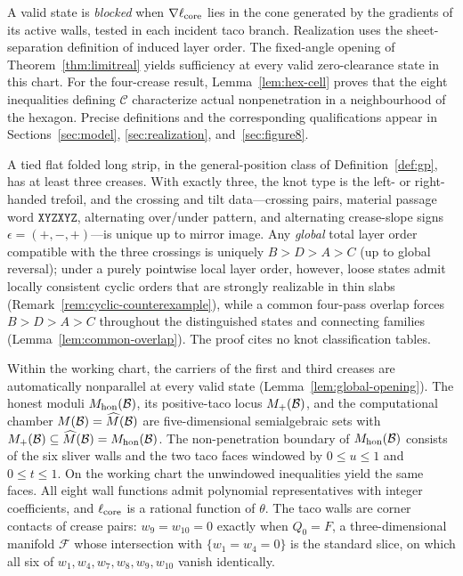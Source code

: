 A valid state is \emph{blocked} when $\nabla\ell_{\mathrm{core}}$ lies in the cone generated by the gradients of its active walls, tested in each incident taco branch. Realization uses the sheet-separation definition of induced layer order. The fixed-angle opening of Theorem~\ref{thm:limitreal} yields sufficiency at every valid zero-clearance state in this chart. For the four-crease result, Lemma~\ref{lem:hex-cell} proves that the eight inequalities defining $\mathcal C$ characterize actual nonpenetration in a neighbourhood of the hexagon. Precise definitions and the corresponding qualifications appear in Sections~\ref{sec:model}, \ref{sec:realization}, and~\ref{sec:figure8}.

\begin{mainthm}\label{mainthm:fold}
A tied flat folded long strip, in the general-position class of Definition~\textup{\ref{def:gp}}, has at least three creases. With exactly three, the knot type is the left- or right-handed trefoil, and the crossing and tilt data---crossing pairs, material passage word $\mathtt{XYZXYZ}$, alternating over/under pattern, and alternating crease-slope signs $\epsilon=(+,-,+)$---is unique up to mirror image. Any \emph{global} total layer order compatible with the three crossings is uniquely $B>D>A>C$ (up to global reversal); under a purely pointwise local layer order, however, loose states admit locally consistent cyclic orders that are strongly realizable in thin slabs \textup{(Remark~\ref{rem:cyclic-counterexample})}, while a common four-pass overlap forces $B>D>A>C$ throughout the distinguished states and connecting families \textup{(Lemma~\ref{lem:common-overlap})}. The proof cites no knot classification tables.
\end{mainthm}

\begin{mainthm}\label{mainthm:moduli}
Within the working chart, the carriers of the first and third creases are automatically nonparallel at every valid state (Lemma~\ref{lem:global-opening}). The honest moduli $M_{\mathrm{hon}}(\mathcal{B})$, its positive-taco locus $M_{+}(\mathcal{B})$, and the computational chamber $M(\mathcal{B})=\widehat{M}(\mathcal{B})$ are five-dimensional semialgebraic sets with $M_{+}(\mathcal{B})\subseteq\widehat{M}(\mathcal{B})=M_{\mathrm{hon}}(\mathcal{B})$. The non-penetration boundary of $M_{\mathrm{hon}}(\mathcal{B})$ consists of the six sliver walls and the two taco faces windowed by $0\le u\le1$ and $0\le t\le1$. On the working chart the unwindowed inequalities yield the same faces. All eight wall functions admit polynomial representatives with integer coefficients, and $\ell_{\mathrm{core}}$ is a rational function of $\theta$. The taco walls are corner contacts of crease pairs: $w_9=w_{10}=0$ exactly when $Q_0=F$, a three-dimensional manifold $\mathcal F$ whose intersection with $\{w_1=w_4=0\}$ is the standard slice, on which all six of $w_1,w_4,w_7,w_8,w_9,w_{10}$ vanish identically.
\end{mainthm}

